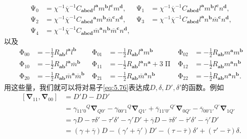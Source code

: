 \begin{equation*}
	\begin{aligned}
		\upPsi _{0} & =\chi ^{-1}\overline{\chi }^{-1} C_{\boldsymbol{abcd}} l^{\boldsymbol{a}} m^{\boldsymbol{b}} l^{\boldsymbol{c}} m^{\boldsymbol{d}} ,\ \  & \upPsi _{1} & =\chi ^{-1}\overline{\chi }^{-1} C_{\boldsymbol{abcd}} l^{\boldsymbol{a}} m^{\boldsymbol{b}} l^{\boldsymbol{c}} n^{\boldsymbol{d}} ,\\
		\upPsi _{2} & =\chi ^{-1}\overline{\chi }^{-1} C{_{\boldsymbol{abcd}}}^{\boldsymbol{a}} m^{\boldsymbol{b}}\overline{m}^{\boldsymbol{c}} n^{\boldsymbol{d}} ,\ \  & \upPsi _{3} & =\chi ^{-1}\overline{\chi }^{-1} C_{\boldsymbol{abcd}} l^{\boldsymbol{a}} n^{\boldsymbol{b}}\overline{m}^{\boldsymbol{c}} n^{\boldsymbol{d}} ,\\
		\upPsi _{4} & =\chi ^{-1}\overline{\chi }^{-1} C_{\boldsymbol{abcd}}\overline{m}^{\boldsymbol{a}} n^{\boldsymbol{b}}\overline{m}^{\boldsymbol{c}} n^{\boldsymbol{d}} , &  & 
	\end{aligned}
\end{equation*}
以及
\begin{equation*}
	\begin{aligned}
		\upPhi _{00} & =-\frac{1}{2} R_{\boldsymbol{ab}} l^{\boldsymbol{a}} l^{\boldsymbol{b}} \ \  & \upPhi _{01} & =-\frac{1}{2} R_{\boldsymbol{ab}} l^{\boldsymbol{a}} m^{\boldsymbol{b}} & \upPhi _{02} & =-\frac{1}{2} R_{\boldsymbol{ab}} m^{\boldsymbol{a}} m^{\boldsymbol{b}}\\
		\upPhi _{10} & =-\frac{1}{2} R_{\boldsymbol{ab}} l^{\boldsymbol{a}}\overline{m}^{\boldsymbol{b}} \ \  & \upPhi _{11} & =-\frac{1}{2} R_{\boldsymbol{ab}} l^{\boldsymbol{a}} n^{\boldsymbol{a}} +3\upPi  & \upPhi _{12} & =-\frac{1}{2} R_{\boldsymbol{ab}} m^{\boldsymbol{a}} n^{\boldsymbol{b}}\\
		\upPhi _{20} & =-\frac{1}{2} R_{\boldsymbol{ab}}\overline{m}^{\boldsymbol{a}}\overline{m}^{\boldsymbol{b}} \  & \upPhi _{21} & =-\frac{1}{2} R_{\boldsymbol{ab}}\overline{m}^{\boldsymbol{a}} n^{\boldsymbol{b}} & \upPhi _{22} & =-\frac{1}{2} R_{\boldsymbol{ab}} n^{\boldsymbol{a}} n^{\boldsymbol{b}} .
	\end{aligned}
\end{equation*}
用这些量，我们就可以将对易子\ref{eq:5.76}表达成$D,\delta ,D',\delta '$的函数。例如
\begin{equation*}
	\begin{aligned}
		[\boldsymbol{\nabla }_{11} ,\boldsymbol{\nabla }_{00}] & =D'D-DD'\\
		& =\gamma {_{11'0}}^{Q}\boldsymbol{\nabla }_{Q0'} -\gamma {_{00'1}}^{Q}\boldsymbol{\nabla }_{Q1'} +\overline{\gamma }{_{11'0'}}^{Q'}\boldsymbol{\nabla }_{0Q'} -\overline{\gamma }{_{00'1'}}^{Q'}\boldsymbol{\nabla }_{1Q'}\\
		& =\gamma D-\tau \delta '-\tau '\delta '-\gamma 'D'+\overline{\gamma } D-\overline{\tau } \delta '-\overline{\tau } '\delta '-\overline{\gamma } 'D'\\
		& =(\gamma +\overline{\gamma } )D-(\gamma '+\overline{\gamma } ')D'-(\tau -\overline{\tau } )\delta '+(\tau '-\overline{\tau } )\delta .
	\end{aligned}
\end{equation*}
